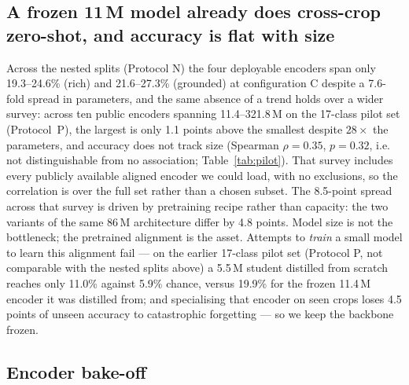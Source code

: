 \documentclass[a4paper,fleqn]{cas-dc}
\begin{document}
\subsection{A frozen 11\,M model already does cross-crop zero-shot, and accuracy is flat with size}
\label{sec:flat}

Across the nested splits (Protocol N) the four deployable encoders span only 19.3--24.6\% (rich)
and 21.6--27.3\% (grounded) at configuration C despite a 7.6-fold spread in parameters, %
and the same absence of a trend holds over a
wider survey: across ten public encoders spanning 11.4--321.8\,M on the 17-class pilot set (Protocol~P), the largest is only 1.1 points above
the smallest despite $28\times$ the parameters, and accuracy does not track size (Spearman $\rho = 0.35$, $p = 0.32$, i.e. not
distinguishable from no association; Table~\ref{tab:pilot}). That survey includes every
publicly available aligned encoder we could load, with no exclusions, so the correlation is
over the full set rather than a chosen subset. The 8.5-point spread across that survey is driven by
pretraining recipe rather than capacity: the two variants of the same 86\,M architecture differ by
4.8 points. Model size is not the bottleneck; the
pretrained alignment is the asset. Attempts to \emph{train} a small model to learn this alignment fail
--- on the earlier 17-class pilot set (Protocol P, not comparable with the nested splits above)
a 5.5\,M student distilled from scratch reaches only 11.0\% against 5.9\% chance, versus 19.9\%
for the frozen 11.4\,M encoder it was distilled from; and specialising that encoder on seen crops
loses 4.5 points of unseen
accuracy to catastrophic forgetting --- so we keep the backbone frozen.




\subsection{Encoder bake-off}
\label{sec:bakeoff}
\end{document}
